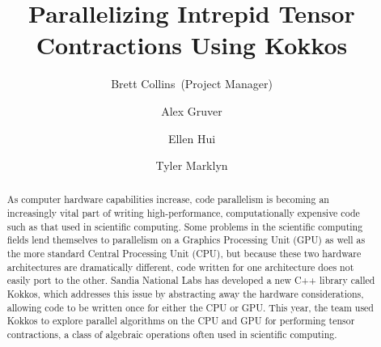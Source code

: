 \documentclass{hmcclinic}
\title{Parallelizing Intrepid Tensor Contractions Using Kokkos}
\author{Brett Collins~(Project Manager) \and Alex Gruver \and Ellen Hui \and
Tyler Marklyn}
\begin{document}

\frontmatter




\maketitle



\begin{abstract}
  As computer hardware capabilities increase, code parallelism is becoming
  an increasingly vital part of writing high-performance, computationally
  expensive code such as that used in scientific computing.  Some problems in
  the scientific computing fields lend themselves to parallelism on a Graphics
  Processing Unit (GPU) as well as the more standard Central Processing Unit
  (CPU), but because these two hardware architectures are dramatically
  different, code written for one architecture does not easily port to the
  other.  Sandia National Labs has developed a new C++ library called Kokkos,
  which addresses this issue by abstracting away the hardware considerations,
  allowing code to be written once for either the CPU or GPU.  This year, the
  team used Kokkos to explore parallel algorithms on the CPU and GPU for
  performing tensor contractions, a class of algebraic operations often used in
  scientific computing.

\end{abstract}


\end{document}
